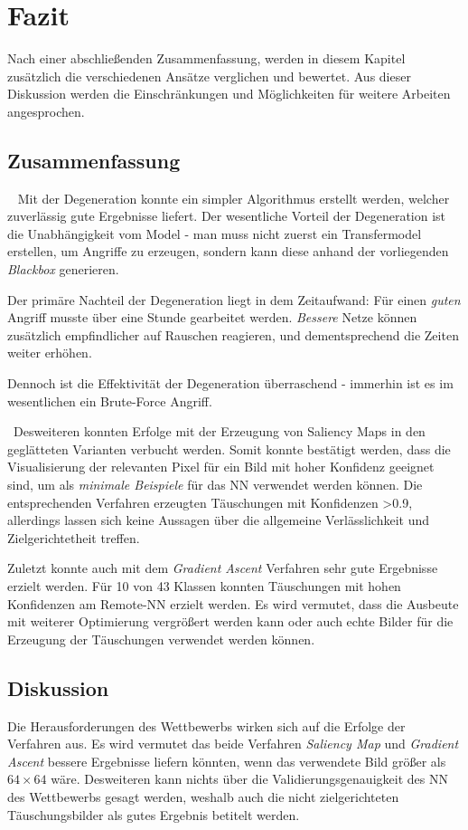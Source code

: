 \chapter{Fazit}
\label{cha:Fazit} \label{cha:Schluss}
Nach einer abschließenden Zusammenfassung, werden in diesem Kapitel zusätzlich die verschiedenen Ansätze verglichen und bewertet. Aus dieser Diskussion werden die Einschränkungen und Möglichkeiten für weitere Arbeiten angesprochen.

\section{Zusammenfassung} ~\newline 
Mit der Degeneration konnte ein simpler Algorithmus erstellt werden, welcher zuverlässig gute Ergebnisse liefert. 
Der wesentliche Vorteil der Degeneration ist die Unabhängigkeit vom Model - man muss nicht zuerst ein Transfermodel erstellen, um Angriffe zu erzeugen, sondern kann diese anhand der vorliegenden \textit{Blackbox} generieren.  

Der primäre Nachteil der Degeneration liegt in dem Zeitaufwand: Für einen \textit{guten} Angriff musste über eine Stunde gearbeitet werden. \textit{Bessere} Netze können zusätzlich empfindlicher auf Rauschen reagieren, und dementsprechend die Zeiten weiter erhöhen. 
  
Dennoch ist die Effektivität der Degeneration überraschend - immerhin ist es im wesentlichen ein Brute-Force Angriff. 

~\newline Desweiteren konnten Erfolge mit der Erzeugung von Saliency Maps in den geglätteten Varianten verbucht werden. Somit konnte bestätigt werden, dass die Visualisierung der relevanten Pixel für ein Bild mit hoher Konfidenz geeignet sind, um als \textit{minimale Beispiele} für das NN verwendet werden können. 
Die entsprechenden Verfahren erzeugten Täuschungen mit Konfidenzen >0.9, allerdings lassen sich keine Aussagen über die allgemeine Verlässlichkeit und Zielgerichtetheit treffen.

Zuletzt konnte auch mit dem \textit{Gradient Ascent} Verfahren sehr gute Ergebnisse erzielt werden. Für 10 von 43 Klassen konnten Täuschungen mit hohen Konfidenzen am Remote-NN erzielt werden. Es wird vermutet, dass die Ausbeute mit weiterer Optimierung vergrößert werden kann oder auch echte Bilder für die Erzeugung der Täuschungen verwendet werden können.

\section{Diskussion}
Die Herausforderungen des Wettbewerbs wirken sich auf die Erfolge der Verfahren aus. Es wird vermutet das beide Verfahren \textit{Saliency Map} und \textit{Gradient Ascent} bessere Ergebnisse liefern könnten, wenn das verwendete Bild größer als $64\times64$ wäre. Desweiteren kann nichts über die Validierungsgenauigkeit des \ac{NN} des Wettbewerbs gesagt werden, weshalb auch die nicht zielgerichteten Täuschungsbilder als gutes Ergebnis betitelt werden. 


